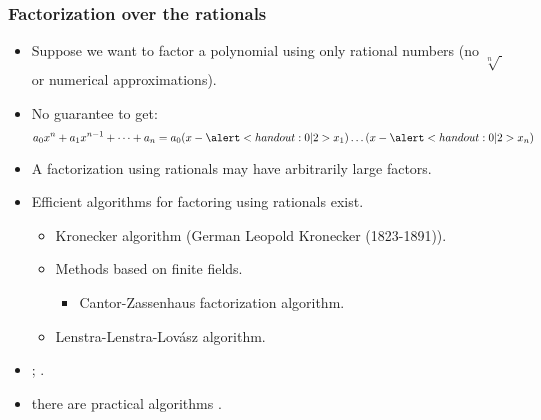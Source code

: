\begin{frame}
\frametitle{Factorization over the rationals}
\begin{itemize}
\item Suppose we want to factor a polynomial using only rational numbers (no $\sqrt[n]{~}$ or numerical approximations).
\item<2-> No guarantee to get:
\[
a_0 x^{n}+a_1x^{n-1}+\dots + a_n=a_0 (x- \alertNoH{2}{x_1} )\dots (x-\alertNoH{2}{ x_n} )
\]
\item<3-> A factorization using rationals may have arbitrarily large factors.
\item<4-> Efficient algorithms for factoring using rationals exist.
\begin{itemize}
\item<5-> Kronecker algorithm (German Leopold Kronecker (1823-1891)).
\item<6-> Methods based on finite fields.
\begin{itemize}
\item<7-> Cantor-Zassenhaus factorization algorithm.
\end{itemize}
\item<8-> Lenstra-Lenstra-Lov\'{a}sz algorithm. 
\end{itemize}
\item<9-> ; .
\item<10->  there are practical algorithms .
\end{itemize}
\end{frame}